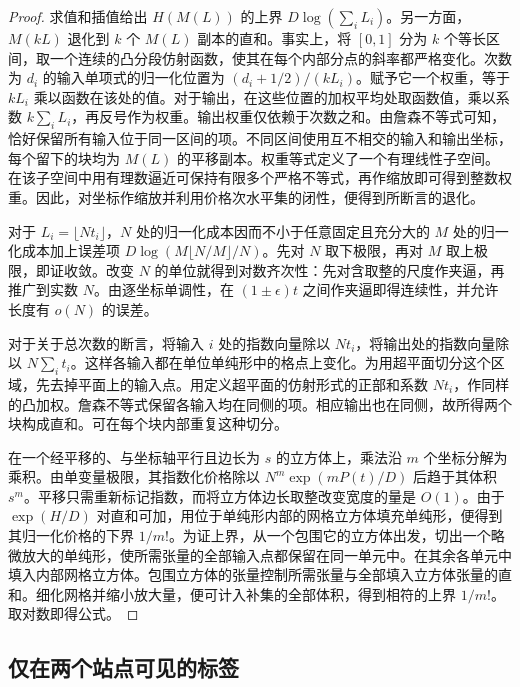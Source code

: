\begin{proof}
求值和插值给出 $H(M(L))$ 的上界 $D\log(\sum_iL_i)$。另一方面，$M(kL)$ 退化到 $k$ 个 $M(L)$ 副本的直和。事实上，将 $[0,1]$ 分为 $k$ 个等长区间，取一个连续的凸分段仿射函数，使其在每个内部分点的斜率都严格变化。次数为 $d_i$ 的输入单项式的归一化位置为 $(d_i+1/2)/(kL_i)$。赋予它一个权重，等于 $kL_i$ 乘以函数在该处的值。对于输出，在这些位置的加权平均处取函数值，乘以系数 $k\sum_i L_i$，再反号作为权重。输出权重仅依赖于次数之和。由詹森不等式可知，恰好保留所有输入位于同一区间的项。不同区间使用互不相交的输入和输出坐标，每个留下的块均为 $M(L)$ 的平移副本。权重等式定义了一个有理线性子空间。在该子空间中用有理数逼近可保持有限多个严格不等式，再作缩放即可得到整数权重。因此，对坐标作缩放并利用价格次水平集的闭性，便得到所断言的退化。

对于 $L_i=\lfloor Nt_i\rfloor$，$N$ 处的归一化成本因而不小于任意固定且充分大的 $M$ 处的归一化成本加上误差项 $D\log(M\lfloor N/M\rfloor/N)$。先对 $N$ 取下极限，再对 $M$ 取上极限，即证收敛。改变 $N$ 的单位就得到对数齐次性：先对含取整的尺度作夹逼，再推广到实数 $N$。由逐坐标单调性，在 $(1\pm\epsilon)t$ 之间作夹逼即得连续性，并允许长度有 $o(N)$ 的误差。

对于关于总次数的断言，将输入 $i$ 处的指数向量除以 $Nt_i$，将输出处的指数向量除以 $N\sum_i t_i$。这样各输入都在单位单纯形中的格点上变化。为用超平面切分这个区域，先去掉平面上的输入点。用定义超平面的仿射形式的正部和系数 $Nt_i$，作同样的凸加权。詹森不等式保留各输入均在同侧的项。相应输出也在同侧，故所得两个块构成直和。可在每个块内部重复这种切分。

在一个经平移的、与坐标轴平行且边长为 $s$ 的立方体上，乘法沿 $m$ 个坐标分解为乘积。由单变量极限，其指数化价格除以 $N^m\exp(mP(t)/D)$ 后趋于其体积 $s^m$。平移只需重新标记指数，而将立方体边长取整改变宽度的量是 $O(1)$。由于 $\exp(H/D)$ 对直和可加，用位于单纯形内部的网格立方体填充单纯形，便得到其归一化价格的下界 $1/m!$。为证上界，从一个包围它的立方体出发，切出一个略微放大的单纯形，使所需张量的全部输入点都保留在同一单元中。在其余各单元中填入内部网格立方体。包围立方体的张量控制所需张量与全部填入立方体张量的直和。细化网格并缩小放大量，便可计入补集的全部体积，得到相符的上界 $1/m!$。取对数即得公式。
\end{proof}

\subsection{仅在两个站点可见的标签}


